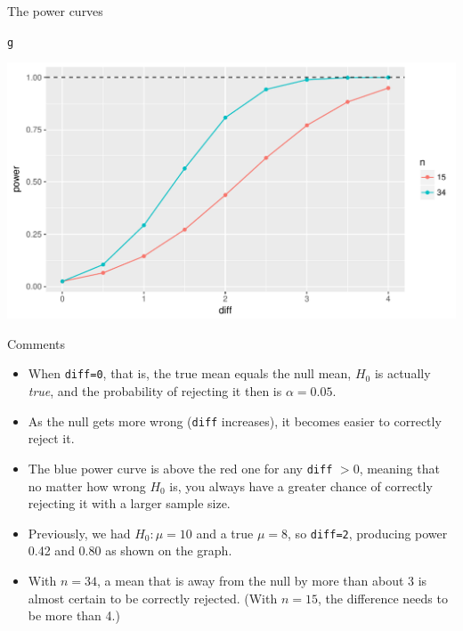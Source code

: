 \documentclass[unknownkeysallowed]{beamer}\usepackage[]{graphicx}\usepackage[]{color}
\makeatletter
\def\maxwidth{ %
  \ifdim\Gin@nat@width>\linewidth
    \linewidth
  \else
    \Gin@nat@width
  \fi
}
\newcommand{\hlstd}[1]{\textcolor[rgb]{0.345,0.345,0.345}{#1}}%
\newenvironment{kframe}{%
 \def\at@end@of@kframe{}%
 \ifinner\ifhmode%
  \def\at@end@of@kframe{\end{minipage}}%
  \begin{minipage}{\columnwidth}%
 \fi\fi%
 \def\FrameCommand##1{\hskip\@totalleftmargin \hskip-\fboxsep
 \colorbox{shadecolor}{##1}\hskip-\fboxsep
     \hskip-\linewidth \hskip-\@totalleftmargin \hskip\columnwidth}%
 \MakeFramed {\advance\hsize-\width
   \@totalleftmargin\z@ \linewidth\hsize
   \@setminipage}}%
 {\par\unskip\endMakeFramed%
 \at@end@of@kframe}
\newenvironment{knitrout}{}{} %
\makeatother
\begin{document}
\begin{frame}[fragile]{The power curves}
  
\begin{knitrout}
\color{fgcolor}\begin{kframe}
\begin{alltt}
\hlstd{g}
\end{alltt}
\end{kframe}
\includegraphics[width=\maxwidth]{figure/unnamed-chunk-82-1} 

\end{knitrout}
\end{frame}

\begin{frame}[fragile]{Comments}
  \begin{itemize}
  \item When \texttt{diff=0}, that is, the true mean equals the null
    mean, $H_0$ is actually \emph{true}, and the probability of
    rejecting it then is $\alpha=0.05$.
  \item As the null gets more wrong (\texttt{diff} increases), it
    becomes easier to correctly reject it.
  \item The blue power curve is above the red one for any
    \texttt{diff} $>0$, meaning that no matter how wrong $H_0$ is, you
    always have a greater chance of correctly rejecting it with a
    larger sample size.
  \item Previously, we had $H_0: \mu=10$ and a true $\mu=8$, so
    \texttt{diff=2}, producing power 0.42 and 0.80 as shown on the
    graph.
  \item With $n=34$, a mean that is away from the null by more than about 3 is
    almost certain to be correctly rejected. (With $n=15$, the
    difference needs to be more than 4.)
  \end{itemize}
\end{frame}
\end{document}

